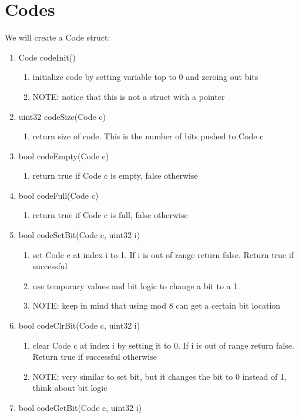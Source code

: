 \documentclass[11pt]{article}
\begin{document}
\section{Codes}\label{ss:codes}
We will create a Code struct:
\begin{enumerate}
\item Code codeInit()
	\begin{enumerate}
	\item initialize code by setting variable top to 0 and zeroing out bits
	\item NOTE: notice that this is not a struct with a pointer
	\end{enumerate}
\item uint32 codeSize(Code c)
	\begin{enumerate}
	\item return size of code. This is the number of bits pushed to Code c
	\end{enumerate}
\item bool codeEmpty(Code c)
	\begin{enumerate}
	\item return true if Code c is empty, false otherwise
	\end{enumerate}
\item bool codeFull(Code c)
	\begin{enumerate}
	\item return true if Code c is full, false otherwise
	\end{enumerate}
\item bool codeSetBit(Code c, uint32 i)
	\begin{enumerate}
	\item set Code c at index i to 1. If i is out of range return false. Return true if successful
	\item use temporary values and bit logic to change a bit to a 1 
	\item NOTE: keep in mind that using mod 8 can get a certain bit location
	\end{enumerate}
\item bool codeClrBit(Code c, uint32 i)
	\begin{enumerate}
	\item clear Code c at index i by setting it to 0. If i is out of range return false. Return true if successful otherwise
	\item NOTE: very similar to set bit, but it changes the bit to 0 instead of 1, think about bit logic 
	\end{enumerate}
\item bool codeGetBit(Code c, uint32 i)

\end{enumerate}
\end{document}
